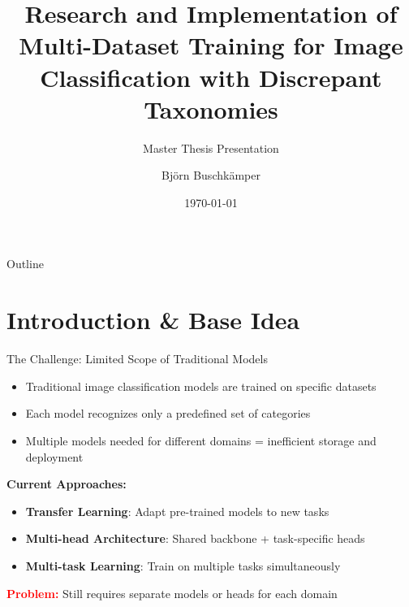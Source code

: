 \documentclass[aspectratio=169]{beamer}
\title{Research and Implementation of Multi-Dataset Training for Image Classification with Discrepant Taxonomies}
\subtitle{Master Thesis Presentation}
\author{Björn Buschkämper}
\institute{Technical Faculty, Bielefeld University}
\date{\today}
\begin{document}
\begin{frame}
    \titlepage
\end{frame}

\begin{frame}{Outline}
    \tableofcontents
\end{frame}

\section{Introduction \& Base Idea}

\begin{frame}{The Challenge: Limited Scope of Traditional Models}
    \begin{itemize}
        \item Traditional image classification models are trained on specific datasets
        \item Each model recognizes only a predefined set of categories
        \item Multiple models needed for different domains = inefficient storage and deployment
    \end{itemize}

    \vspace{1em}

    \textbf{Current Approaches:}
    \begin{itemize}
        \item \textbf{Transfer Learning}: Adapt pre-trained models to new tasks
        \item \textbf{Multi-head Architecture}: Shared backbone + task-specific heads
        \item \textbf{Multi-task Learning}: Train on multiple tasks simultaneously
    \end{itemize}

    \vspace{1em}

    \textcolor{red}{\textbf{Problem:}} Still requires separate models or heads for each domain
\end{frame}
\end{document}
